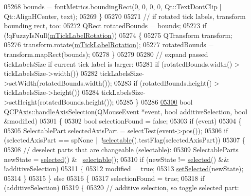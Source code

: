 \begin{DoxyCode}
05268     bounds = fontMetrics.boundingRect(0, 0, 0, 0, Qt::TextDontClip | Qt::AlignHCenter, text);
05269   \}
05270   
05271   \textcolor{comment}{// if rotated tick labels, transform bounding rect, too:}
05272   QRect rotatedBounds = bounds;
05273   \textcolor{keywordflow}{if} (!qFuzzyIsNull(\hyperlink{a00025_a47660c8694884cdb87495bf8b4c8a3b9}{mTickLabelRotation}))
05274   \{
05275     QTransform transform;
05276     transform.rotate(\hyperlink{a00025_a47660c8694884cdb87495bf8b4c8a3b9}{mTickLabelRotation});
05277     rotatedBounds = transform.mapRect(bounds);
05278   \}
05279   
05280   \textcolor{comment}{// expand passed tickLabelsSize if current tick label is larger:}
05281   \textcolor{keywordflow}{if} (rotatedBounds.width() > tickLabelsSize->width()) 
05282     tickLabelsSize->setWidth(rotatedBounds.width());
05283   \textcolor{keywordflow}{if} (rotatedBounds.height() > tickLabelsSize->height())
05284     tickLabelsSize->setHeight(rotatedBounds.height());
05285 \}
05286 
\hypertarget{a00115_source_l05300}{}\hyperlink{a00025_ac68d1c81004fded1f3c4ca95879a445d}{05300} \textcolor{keywordtype}{bool} \hyperlink{a00025_ac68d1c81004fded1f3c4ca95879a445d}{QCPAxis::handleAxisSelection}(QMouseEvent *event, \textcolor{keywordtype}{bool} additiveSelection, \textcolor{keywordtype}{
      bool} &modified)
05301 \{
05302   \textcolor{keywordtype}{bool} selectionFound = \textcolor{keyword}{false};
05303   \textcolor{keywordflow}{if} (event)
05304   \{
05305     SelectablePart selectedAxisPart = \hyperlink{a00025_a940be5ef61f4fa0dc21e4f4c7a5875c2}{selectTest}(event->pos());
05306     \textcolor{keywordflow}{if} (selectedAxisPart == spNone || !\hyperlink{a00025_a4e83e383fb5fbd9cf3759fab68f79aa6}{selectable}().testFlag(selectedAxisPart))
05307     \{
05308       \textcolor{comment}{// deselect parts that are changeable (selectable):}
05309       SelectableParts newState = \hyperlink{a00025_a534509949b91a6aa08e38cca48b62c9e}{selected}() & ~\hyperlink{a00025_a4e83e383fb5fbd9cf3759fab68f79aa6}{selectable}();
05310       \textcolor{keywordflow}{if} (newState != \hyperlink{a00025_a534509949b91a6aa08e38cca48b62c9e}{selected}() && !additiveSelection)
05311       \{
05312         modified = \textcolor{keyword}{true};
05313         \hyperlink{a00025_a24c13908da2f8d629b1bbbe9cbd63e39}{setSelected}(newState);
05314       \}
05315     \} \textcolor{keywordflow}{else}
05316     \{
05317       selectionFound = \textcolor{keyword}{true};
05318       \textcolor{keywordflow}{if} (additiveSelection)
05319       \{
05320         \textcolor{comment}{// additive selection, so toggle selected part:}

\end{DoxyCode}
